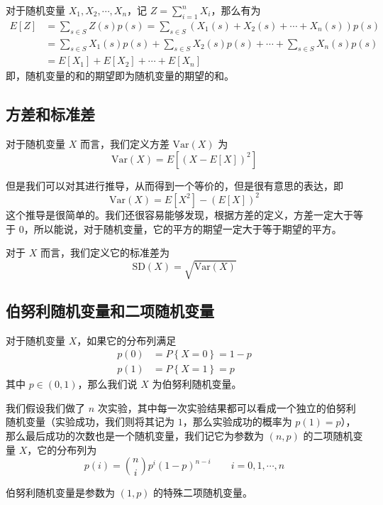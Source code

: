\documentclass[utf8,a4paper,nofonts,9pt]{ctexbook}
\begin{document}
对于随机变量 $X_1, X_2, \cdots, X_n$，记 $Z = \sum_{i = 1}^n X_i$，那么有为
\begin{align*}
    E[Z] & = \sum_{s \in S} Z(s) p(s) = \sum_{s \in S} \left( X_1(s) + X_2(s) + \cdots + X_n(s) \right) p(s) \\
         & = \sum_{s \in S} X_1(s) p(s) + \sum_{s \in S} X_2(s) p(s) + \cdots + \sum_{s \in S} X_n(s) p(s) \\
         & = E[X_1] + E[X_2] + \cdots + E[X_n]
\end{align*}
即，随机变量的和的期望即为随机变量的期望的和。


\subsection{方差和标准差}

对于随机变量 $X$ 而言，我们定义方差 $\textrm{Var}(X)$ 为
\[
    \textrm{Var}(X) = E\left[ (X - E[X])^2 \right]
\]

但是我们可以对其进行推导，从而得到一个等价的，但是很有意思的表达，即
\[
    \textrm{Var}(X) = E[X^2] - (E[X])^2
\]
这个推导是很简单的。我们还很容易能够发现，根据方差的定义，方差一定大于等于 $0$，所以能说，对于随机变量，它的平方的期望一定大于等于期望的平方。

对于 $X$ 而言，我们定义它的标准差为
\[
    \textrm{SD}(X) = \sqrt{\textrm{Var}(X)}
\]

\subsection{伯努利随机变量和二项随机变量}

对于随机变量 $X$，如果它的分布列满足
\begin{align*}
    p(0) & = P\left\{ X = 0 \right\} = 1 - p \\
    p(1) & = P\left\{ X = 1 \right\} = p
\end{align*}
其中 $p \in (0, 1)$，那么我们说 $X$ 为伯努利随机变量。

我们假设我们做了 $n$ 次实验，其中每一次实验结果都可以看成一个独立的伯努利随机变量（实验成功，我们则将其记为 $1$，那么实验成功的概率为 $p(1) = p$），那么最后成功的次数也是一个随机变量，我们记它为参数为 $(n, p)$ 的二项随机变量 $X$，它的分布列为
\[
    p(i) = {n \choose i} p^i (1 - p)^{n - i} \qquad i = 0, 1, \cdots, n
\]

伯努利随机变量是参数为 $(1, p)$ 的特殊二项随机变量。
\end{document}
